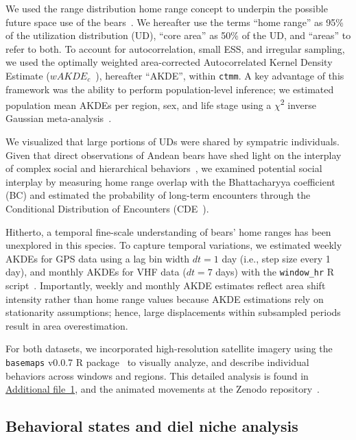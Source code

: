 \documentclass[lineno,referee,pdflatex,sn-vancouver-num]{sn-jnl}%
\theoremstyle{thmstyleone}%
\theoremstyle{thmstyletwo}%
\theoremstyle{thmstylethree}%
\begin{document}
We used the range distribution home range concept to underpin the possible future space use of the bears~\cite{alstonClarifyingSpaceUse2022}. We hereafter use the terms ``home range'' as 95\% of the utilization distribution (UD), ``core area'' as 50\% of the UD, and ``areas'' to refer to both. To account for autocorrelation, small ESS, and irregular sampling, we used the optimally weighted area-corrected Autocorrelated Kernel Density Estimate ($wAKDE_{c}$~\cite{flemingCorrectingMissingIrregular2018,flemingOvercomingChallengeSmall2019}), hereafter ``AKDE'', within \texttt{ctmm}. A key advantage of this framework was the ability to perform population-level inference; we estimated population mean AKDEs per region, sex, and life stage using a $\chi$\textsuperscript{2} inverse Gaussian meta-analysis~\cite{flemingPopulationlevelInferenceHomerange2021}.

We visualized that large portions of UDs were shared by sympatric individuals. Given that direct observations of Andean bears have shed light on the interplay of complex social and hierarchical behaviors~\cite{parra-romeroNotEatingAlone2019,vasquezSocialBehaviorAndean2024}, we examined potential social interplay by measuring home range overlap with the Bhattacharyya coefficient (BC) and estimated the probability of long-term encounters through the Conditional Distribution of Encounters (CDE~\cite{noonanEstimatingEncounterLocation2021}).

Hitherto, a temporal fine-scale understanding of bears' home ranges has been unexplored in this species. To capture temporal variations, we estimated weekly AKDEs for GPS data using a lag bin width $dt = 1$ day (i.e., step size every 1 day), and monthly AKDEs for VHF data ($dt = 7$ days) with the \texttt{window\_hr} R script~\cite{mezziniHowResourceAbundance2025}. Importantly, weekly and monthly AKDE estimates reflect area shift intensity rather than home range values because AKDE estimations rely on stationarity assumptions; hence, large displacements within subsampled periods result in area overestimation.

For both datasets, we incorporated high-resolution satellite imagery using the \texttt{basemaps} v0.0.7 R package~\cite{SchwalbJakobbasemaps} to visually analyze, and describe individual behaviors across windows and regions. This detailed analysis is found in \hyperref[S1_File]{Additional file~1}, and the animated movements at the Zenodo repository~\cite{zenodoMovementsBears}.

\subsection{Behavioral states and diel niche analysis}
\end{document}

